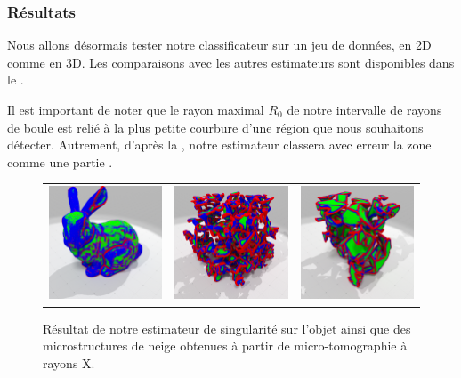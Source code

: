 \subsubsection{Résultats}%
\label{sec:applications:feature:II:results}
%
Nous allons désormais tester notre classificateur sur un jeu de données, en 2D comme en
3D. Les comparaisons avec les autres estimateurs sont disponibles dans le
.


Il est important de noter que le rayon maximal $R_0$ de notre intervalle de
rayons de boule est relié à la plus petite courbure d'une région \featsmooth
que nous souhaitons détecter. Autrement, d'après la
, notre estimateur classera avec erreur la zone
comme une partie \featflat.
%
%

\begin{figure}[ht]
  \begin{center}
    \setlength{\tabcolsep}{1pt}
    \begin{tabular}{c c c}
      \includegraphics[width=4.5cm]{images/Feature/Bunny_512_II_scale} &
      \includegraphics[width=4.5cm]{images/Feature/Snow_I08_II_scale} &
      \includegraphics[width=4.5cm]{images/Feature/Snow_E2bis_II_scale} \\
    \end{tabular}
    \caption{Résultat de notre estimateur de singularité sur l'objet \Bunny ainsi que des microstructures de neige obtenues à partir de micro-tomographie à rayons X.\label{fig:feature-snow}}
  \end{center}
\end{figure}

